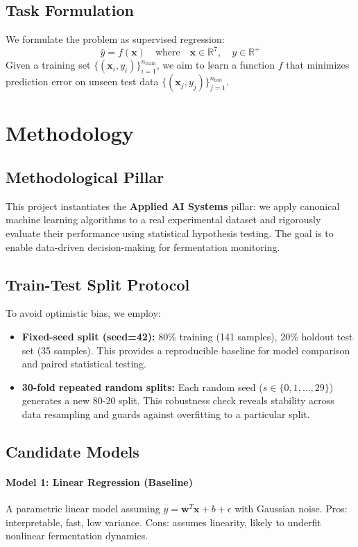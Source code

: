 \documentclass[conference]{IEEEtran}
\begin{document}
\subsection{Task Formulation}
We formulate the problem as supervised regression:
\[
\hat{y} = f(\mathbf{x}) \quad \text{where} \quad \mathbf{x} \in \mathbb{R}^7, \quad y \in \mathbb{R}^+
\]
Given a training set $\{(\mathbf{x}_i, y_i)\}_{i=1}^{n_{\text{train}}}$, we aim to learn a function $f$ that minimizes prediction error on unseen test data $\{(\mathbf{x}_j, y_j)\}_{j=1}^{n_{\text{test}}}$.

\section{Methodology}

\subsection{Methodological Pillar}
This project instantiates the \textbf{Applied AI Systems} pillar: we apply canonical machine learning algorithms to a real experimental dataset and rigorously evaluate their performance using statistical hypothesis testing. The goal is to enable data-driven decision-making for fermentation monitoring.

\subsection{Train-Test Split Protocol}
To avoid optimistic bias, we employ:
\begin{itemize}
\item \textbf{Fixed-seed split (seed=42):} 80\% training (141 samples), 20\% holdout test set (35 samples). This provides a reproducible baseline for model comparison and paired statistical testing.
\item \textbf{30-fold repeated random splits:} Each random seed ($s \in \{0, 1, \ldots, 29\}$) generates a new 80-20 split. This robustness check reveals stability across data resampling and guards against overfitting to a particular split.
\end{itemize}

\subsection{Candidate Models}

\paragraph{Model 1: Linear Regression (Baseline)}
A parametric linear model assuming $y = \mathbf{w}^T \mathbf{x} + b + \epsilon$ with Gaussian noise. Pros: interpretable, fast, low variance. Cons: assumes linearity, likely to underfit nonlinear fermentation dynamics.
\end{document}
